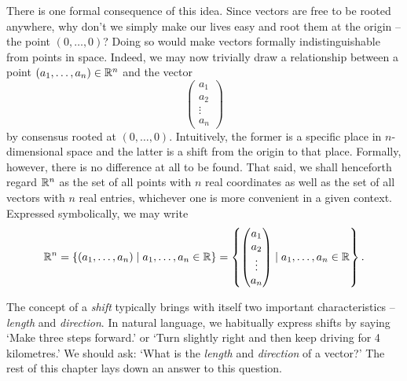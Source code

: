 There is one formal consequence of this idea. Since vectors are free to be
rooted anywhere, why don't we simply make our lives easy and root them at the
origin -- the point $(0,\ldots,0)$? Doing so would make vectors formally
indistinguishable from points in space. Indeed, we may now trivially draw a
relationship between a point $(a_1,\ldots,a_n) \in \mathbb{R}^{n}$ and the vector
\[
 \begin{pmatrix}
  a_1\\
  a_2\\
  \vdots\\
  a_n
 \end{pmatrix}
\]
by consensus rooted at $(0,\ldots,0)$. Intuitively, the former is a specific
place in $n$-dimensional space and the latter is a shift from the origin to that
place. Formally, however, there is no difference at all to be found. That said,
we shall henceforth regard $\mathbb{R}^{n}$ as the set of all points with $n$ real
coordinates as well as the set of all vectors with $n$ real entries, whichever
one is more convenient in a given context. Expressed symbolically, we may write
\[
 \mathbb{R}^{n} = \{(a_1,\ldots,a_n) \mid a_1,\ldots,a_n \in \mathbb{R}\} = \left\{
  \begin{pmatrix}
   a_1\\
   a_2\\
   \vdots\\
   a_n
  \end{pmatrix} \mid a_1,\ldots,a_n \in \mathbb{R}
 \right\}.
\]

The concept of a \emph{shift} typically brings with itself two important
characteristics -- \emph{length} and \emph{direction}. In natural language, we
habitually express shifts by saying `Make three steps forward.' or `Turn
slightly right and then keep driving for 4 kilometres.' We should ask: `What is
the \emph{length} and \emph{direction} of a vector?' The rest of this chapter
lays down an answer to this question.



